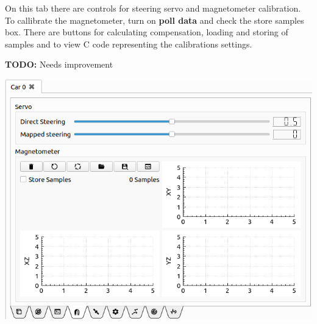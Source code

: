 \documentclass[12pt]{article} %
\newcommand{\todo}[1]{{\color{red} \textbf{TODO:} #1}}
\begin{document}
\noindent\begin{minipage}{0.5\textwidth} %
On this tab there are controls for steering servo and magnetometer
calibration.  To callibrate the magnetometer, turn on {\bf poll data}
and check the store samples box. There are buttons for calculating
compensation, loading and storing of samples and to view C code
representing the calibrations settings.

\todo{Needs improvement}

\end{minipage}
\begin{minipage}{0.5\textwidth}
  \noindent \includegraphics[width=\textwidth]{./screens/Car_calibration.png}
\end{minipage}
\end{document}
